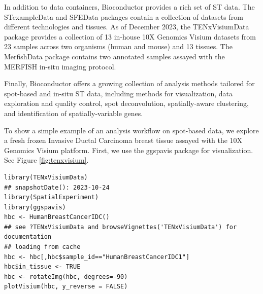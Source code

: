 \documentclass[graybox]{svmult}
\begin{document}
In addition to data containers, Bioconductor provides a rich set of ST data.
The STexampleData and SFEData packages contain a collection of datasets from
different technologies and tissues.
As of December 2023,
the TENxVisiumData package provides a collection of 13 in-house 10X Genomics
Visium datasets from 23 samples across two organisms (human and mouse) and 13
tissues.
The MerfishData package contains two annotated samples assayed with the MERFISH
in-situ imaging protocol.

Finally, Bioconductor offers a growing collection of analysis methods tailored
for spot-based and in-situ ST data, including methods for visualization,
data exploration and quality control, spot deconvolution,
spatially-aware clustering, and identification of spatially-variable genes.

To show a simple example of an analysis workflow on spot-based data,
we explore a fresh frozen
Invasive Ductal Carcinoma breast tissue assayed
with the 10X Genomics Visium platform.
First, we use the ggspavis package for visualization.
See Figure \ref{fig:tenxvisium}.


\begin{shaded}
\begin{verbatim}
library(TENxVisiumData)
## snapshotDate(): 2023-10-24
library(SpatialExperiment)
library(ggspavis)
hbc <- HumanBreastCancerIDC()
## see ?TENxVisiumData and browseVignettes('TENxVisiumData') for documentation
## loading from cache
hbc <- hbc[,hbc$sample_id=="HumanBreastCancerIDC1"]
hbc$in_tissue <- TRUE
hbc <- rotateImg(hbc, degrees=-90)
plotVisium(hbc, y_reverse = FALSE)
\end{verbatim}
\end{shaded}
\end{document}
